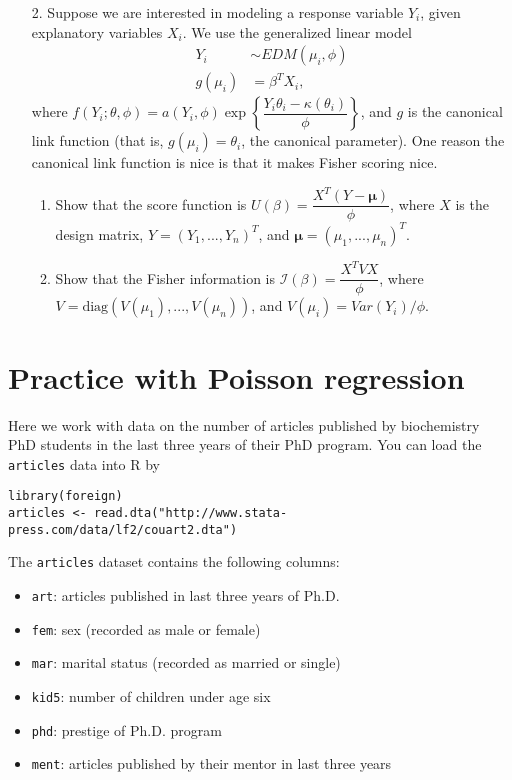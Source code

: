 \documentclass[11pt]{article}
\begin{document}
\begin{enumerate}
\item[2.] Suppose we are interested in modeling a response variable $Y_i$, given explanatory variables $X_i$. We use the generalized linear model
\begin{align*}
Y_i &\sim EDM(\mu_i, \phi) \\
g(\mu_i) &= \beta^T X_i,
\end{align*}
where $f(Y_i; \theta, \phi) = a(Y_i, \phi) \exp \left \lbrace \dfrac{Y_i \theta_i - \kappa(\theta_i)}{\phi} \right\rbrace$, and $g$ is the canonical link function (that is, $g(\mu_i) = \theta_i$, the canonical parameter). One reason the canonical link function is nice is that it makes Fisher scoring nice.

\begin{enumerate}
\item Show that the score function is $U(\beta) = \dfrac{X^T(Y - \bm{\mu})}{\phi}$, where $X$ is the design matrix, $Y = (Y_1,...,Y_n)^T$, and $\bm{\mu} = (\mu_1,...,\mu_n)^T$.

\item Show that the Fisher information is $\mathcal{I}(\beta) = \dfrac{X^T V X}{\phi}$, where $V = \text{diag}(V(\mu_1),...,V(\mu_n))$, and $V(\mu_i) = Var(Y_i)/\phi$.
\end{enumerate}
\end{enumerate}

\section{Practice with Poisson regression}

Here we work with data on the number of articles published by biochemistry PhD students in the last three years of their PhD program. You can load the \verb;articles; data into R by

\begin{verbatim}
library(foreign)
articles <- read.dta("http://www.stata-press.com/data/lf2/couart2.dta")
\end{verbatim}

\noindent The \verb;articles; dataset contains the following columns:

\begin{itemize}
\item \verb;art;: articles published in last three years of Ph.D.
\item \verb;fem;: sex (recorded as male or female)
\item \verb;mar;: marital status (recorded as married or single)
\item \verb;kid5;: number of children under age six
\item \verb;phd;: prestige of Ph.D. program
\item \verb;ment;: articles published by their mentor in last three years
\end{itemize}
\end{document}
